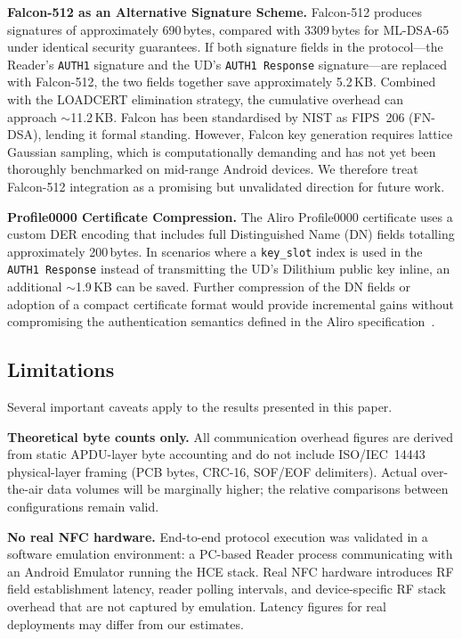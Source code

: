 \textbf{Falcon-512 as an Alternative Signature Scheme.}
Falcon-512 produces signatures of approximately 690\,bytes, compared with 3309\,bytes for ML-DSA-65 under identical security guarantees. If both signature fields in the protocol---the Reader's \texttt{AUTH1} signature and the UD's \texttt{AUTH1 Response} signature---are replaced with Falcon-512, the two fields together save approximately 5.2\,KB. Combined with the LOADCERT elimination strategy, the cumulative overhead can approach $\sim$11.2\,KB. Falcon has been standardised by NIST as FIPS~206 (FN-DSA), lending it formal standing. However, Falcon key generation requires lattice Gaussian sampling, which is computationally demanding and has not yet been thoroughly benchmarked on mid-range Android devices. We therefore treat Falcon-512 integration as a promising but unvalidated direction for future work.

\textbf{Profile0000 Certificate Compression.}
The Aliro Profile0000 certificate uses a custom DER encoding that includes full Distinguished Name (DN) fields totalling approximately 200\,bytes. In scenarios where a \texttt{key\_slot} index is used in the \texttt{AUTH1 Response} instead of transmitting the UD's Dilithium public key inline, an additional $\sim$1.9\,KB can be saved. Further compression of the DN fields or adoption of a compact certificate format would provide incremental gains without compromising the authentication semantics defined in the Aliro specification~\cite{CSA:Aliro10}.

\subsection{Limitations}
\label{subsec:limitations}

Several important caveats apply to the results presented in this paper.

\textbf{Theoretical byte counts only.}
All communication overhead figures are derived from static APDU-layer byte accounting and do not include ISO/IEC~14443 physical-layer framing (PCB bytes, CRC-16, SOF/EOF delimiters). Actual over-the-air data volumes will be marginally higher; the relative comparisons between configurations remain valid.

\textbf{No real NFC hardware.}
End-to-end protocol execution was validated in a software emulation environment: a PC-based Reader process communicating with an Android Emulator running the HCE stack. Real NFC hardware introduces RF field establishment latency, reader polling intervals, and device-specific RF stack overhead that are not captured by emulation. Latency figures for real deployments may differ from our estimates.

